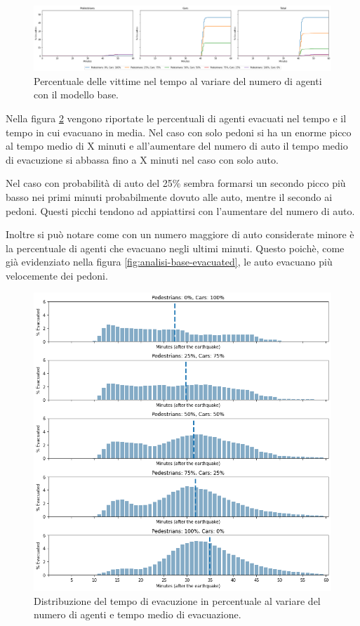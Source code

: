 \begin{figure}[ht]
    \centering
    \includegraphics[width=\textwidth]{images/analisi/base-casualties.png}
    \caption{
        Percentuale delle vittime nel tempo al variare del numero di agenti con il modello base.
    }
    \label{fig:analisi-base-casualties}
\end{figure}

Nella figura \ref{fig:analisi-base-evtimes} vengono riportate le percentuali di agenti evacuati nel tempo e il tempo in cui evacuano in media.
%
Nel caso con solo pedoni si ha un enorme picco al tempo medio di X minuti e all'aumentare del numero di auto 
il tempo medio di evacuzione si abbassa fino a X minuti nel caso con solo auto.

Nel caso con probabilità di auto del 25\% sembra formarsi un secondo picco più basso nei primi minuti probabilmente dovuto alle auto, mentre il secondo ai pedoni.
Questi picchi tendono ad appiattirsi con l'aumentare del numero di auto.

Inoltre si può notare come con un numero maggiore di auto considerate minore è la percentuale di agenti che evacuano negli ultimi minuti.
Questo poichè, come già evidenziato nella figura \ref{fig:analisi-base-evacuated}, le auto evacuano più velocemente dei pedoni.

\begin{figure}
    \centering
    \includegraphics[width=\textwidth]{images/analisi/base-evtimes.png}
    \caption{
        Distribuzione del tempo di evacuzione in percentuale al variare del numero di agenti e tempo medio di evacuazione.
    }
    \label{fig:analisi-base-evtimes}
\end{figure}

